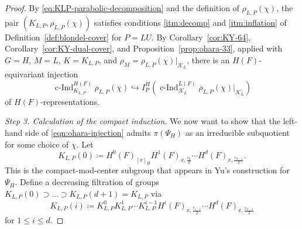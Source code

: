 \documentclass[reqno]{amsart}
\numberwithin{equation}{subsection}
\newcommand\cK{\mathcal{K}}
\DeclareMathOperator{\cInd}{c-Ind}
\theoremstyle{remark}
\numberwithin{equation}{subsection}
\numberwithin{figure}{subsection}
\begin{document}
\begin{proof}
By \eqref{eq:KLP-parabolic-decomposition} and the definition of $\rho_{L,P}(\chi)$, the pair $(K_{L,P}, \rho_{L,P}(\chi))$ satisfies conditions \ref{itm:decomp} and \ref{itm:inflation} of Definition~\ref{def:blondel-cover} for $P=LU$. 
By Corollary~\ref{cor:KY-64}, Corollary~\ref{cor:KY-dual-cover}, and Proposition~\ref{prop:ohara-33}, applied with $G=H$, $M=L$, $K=K_{L,P}$, and $\rho_M=\rho_{L,P}(\chi)|_{\cK_L}$, there is an $H(F)$-equivariant injection
\begin{equation}\label{eqn:ohara-injection}
\cInd_{K_{L,P}}^{H(F)}\rho_{L,P}(\chi) \hookrightarrow I_P^H\!\left(\cInd_{\cK_L}^{L(F)}\rho_{L,P}(\chi)|_{\cK_L}\right)
\end{equation}
of $H(F)$-representations.

\emph{Step 3. Calculation of the compact induction.} We now want to show that the left-hand side of \eqref{eqn:ohara-injection} admits $\pi(\Psi_H)$ as an irreducible subquotient for some choice of $\chi$. Let
\begin{equation}\label{eq:KLP-filtration-zero}
K_{L,P}(0)\coloneqq H^0(F)_{[x]_H}H^1(F)_{x,\frac{r_0}{2}}\cdots
H^d(F)_{x,\frac{r_{d-1}}{2}}.
\end{equation}
This is the compact-mod-center subgroup that appears in Yu's construction for $\Psi_H$. Define a decreasing filtration of groups $K_{L,P}(0) \supset \ldots \supset K_{L,P}(d+1)=K_{L,P}$ via
\begin{equation}\label{eq:KLP-filtration-positive}
K_{L,P}(i)\coloneqq K_{L,P}^0K_{L,P}^1\cdots K_{L,P}^{i-1}
H^i(F)_{x,\frac{r_{i-1}}{2}}\cdots H^d(F)_{x,\frac{r_{d-1}}{2}} 
\end{equation}
for $1 \leq i \leq d$.





\end{proof}
\end{document}
